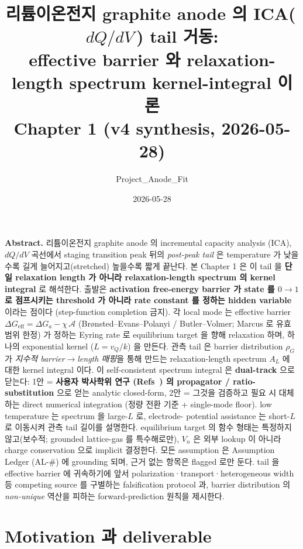 \documentclass[11pt,a4paper]{article}
\title{\textbf{리튬이온전지 graphite anode 의 ICA(\,$dQ/dV$\,) tail 거동:\\
effective barrier 와 relaxation-length spectrum kernel-integral 이론}\\[0.4em]
\large Chapter 1 (v4 synthesis, 2026-05-28)}
\author{Project\_Anode\_Fit}
\date{2026-05-28}
\newcommand{\eff}{\mathrm{eff}}
\begin{document}
\maketitle

\begin{center}\begin{minipage}{0.93\textwidth}
\small \textbf{Abstract.} 리튬이온전지 graphite anode 의 incremental capacity analysis
(ICA), $dQ/dV$ 곡선에서 staging transition peak 뒤의 \emph{post-peak tail} 은 temperature
가 낮을수록 길게 늘어지고(stretched) 높을수록 짧게 끝난다. 본 Chapter 1 은 이 tail 을
\textbf{단일 relaxation length 가 아니라 relaxation-length spectrum 의 kernel integral}
로 해석한다. 출발은 \textbf{activation free-energy barrier 가 state 를 $0\!\to\!1$ 로
점프시키는 threshold 가 아니라 rate constant 를 정하는 hidden variable} 이라는 점이다
(step-function completion 금지). 각 local mode 는 effective barrier $\Delta G_\eff =
\Delta G_a - \chi\,\mathcal A$ (Brønsted--Evans--Polanyi / Butler--Volmer; Marcus 로 유효
범위 한정) 가 정하는 Eyring rate 로 equilibrium target 을 향해 relaxation 하며, 하나의
exponential kernel ($L=v_Q/k$) 을 만든다. 관측 tail 은 barrier distribution $\rho_G$ 가
\emph{지수적 barrier$\to$length 매핑}을 통해 만드는 relaxation-length spectrum $A_L$ 에
대한 kernel integral 이다. 이 self-consistent spectrum integral 은 \textbf{dual-track}
으로 닫는다: 1안 = \textbf{사용자 박사학위 연구 (Refs~\cite{lee2011,son2013}) 의 propagator
/ ratio-substitution} 으로 얻는 analytic closed-form, 2안 = 그것을 검증하고 필요 시 대체하는
direct numerical integration (정량 전환 기준 + single-mode floor). low temperature 는 spectrum 을 large-$L$ 로, electrode-
potential assistance 는 short-$L$ 로 이동시켜 관측 tail 길이를 설명한다. equilibrium
target 의 함수 형태는 특정하지 않고(보수적; grounded lattice-gas 를 특수해로만), $V_n$ 은
외부 lookup 이 아니라 charge conservation 으로 implicit 결정한다. 모든 assumption 은
Assumption Ledger (AL-\#) 에 grounding 되며, 근거 없는 항목은 flagged 로만 둔다. tail 을
effective barrier 에 귀속하기에 앞서 polarization·transport·heterogeneous width 등 competing
source 를 구별하는 falsification protocol 과, barrier distribution 의 \emph{non-unique}
역산을 피하는 forward-prediction 원칙을 제시한다.
\end{minipage}\end{center}

\tableofcontents
\newpage

\section{Motivation 과 deliverable}\label{sec:intro}
\end{document}
